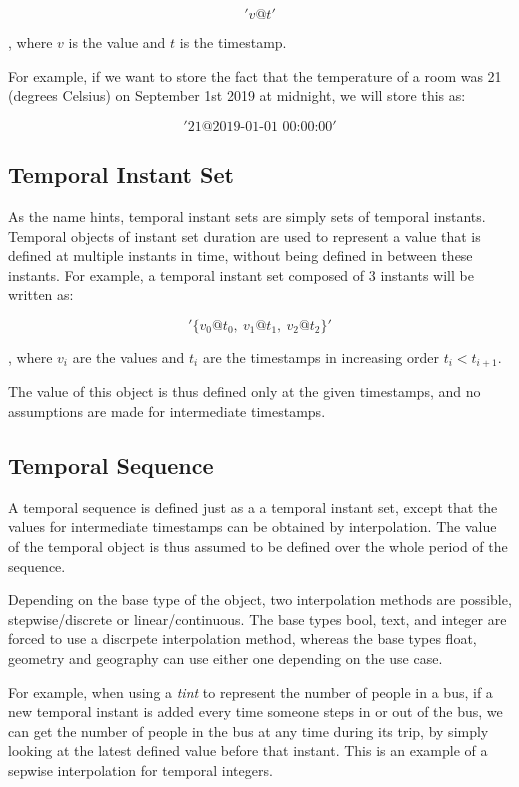 \[
    'v@t'
\]

, where \(v\) is the value and \(t\) is the timestamp.

For example, if we want to store the fact that the temperature of a room was 21 (degrees Celsius) on September 1st 2019 at midnight, we will store this as:

\[
    '21@\text{2019-01-01 00:00:00}'
\]

\subsection{Temporal Instant Set}

As the name hints, temporal instant sets are simply sets of temporal instants. Temporal objects of instant set duration are used to represent a value that is defined at multiple instants in time, without being defined in between these instants. For example, a temporal instant set composed of 3 instants will be written as:

\[
    '\{v_0@t_0,\ v_1@t_1,\ v_2@t_2\}'
\]

, where \(v_i\) are the values and \(t_i\) are the timestamps in increasing order \(t_i < t_{i+1}\).

The value of this object is thus defined only at the given timestamps, and no assumptions are made for intermediate timestamps.

\subsection{Temporal Sequence}

A temporal sequence is defined just as a a temporal instant set, except that the values for intermediate timestamps can be obtained by interpolation. The value of the temporal object is thus assumed to be defined over the whole period of the sequence.

Depending on the base type of the object, two interpolation methods are possible, stepwise/discrete or linear/continuous. The base types bool, text, and integer are forced to use a discrpete interpolation method, whereas the base types float, geometry and geography can use either one depending on the use case.

For example, when using a \textit{tint} to represent the number of people in a bus, if a new temporal instant is added every time someone steps in or out of the bus, we can get the number of people in the bus at any time during its trip, by simply looking at the latest defined value before that instant. This is an example of a sepwise interpolation for temporal integers.

